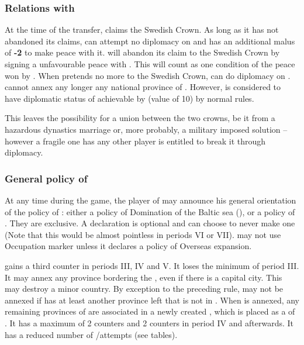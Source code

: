 \subsubsection{Relations with }
\label{chSpecific:Sweden:Denmark}
 At the time of the transfer,
 claims the Swedish Crown. As long as it has not
abandoned its claims, \SUE can attempt no diplomacy on 
and has an additional malus of {\bf -2} to make peace with it.
\aparag {} will abandon its claim to the Swedish Crown by
signing a unfavourable peace with \SUE. This will count as one condition
of the peace won by \SUE.
\bparag When  pretends no more to the Swedish Crown, \SUE
can do diplomacy on .
\bparag \SUE cannot annex any longer any national province of .
However,  is considered to have diplomatic status of \ANNEXION
achievable by \SUE (value of 10) by normal rules.
\begin{designnote}
This leaves the possibility for a union between the two crowns, be it from a
hazardous dynastics marriage or, more probably, a military imposed solution
-- however a fragile one has any other player is entitled to break it through diplomacy.
\end{designnote}
\subsubsection{General policy of }
\aparag At any time during the game, the player of \SUE may announce his
general orientation of the policy of \SUE: either a policy of Domination
of the Baltic sea (), or a policy of
. They are exclusive. A declaration is
optional and \SUE can choose to never make one (Note that this would be
almost pointless in periods VI or VII).
\bparag[] [BLP] \SUE may not use Occupation marker unless it declares
a policy of Overseas expansion.

\label{chSpecific:Sweden:DMB}
\bparag \SUE gains a third \ARMY counter in periods III, IV and V. It
loses the minimum \LeaderE of period III.
\bparag It may annex any province bordering the , even
if there is a capital city. This may destroy a minor country.
\bparag By exception to the preceding rule,  may not
be annexed if  has at least another province left that is
not in . When  is annexed, any
remaining provinces of  are associated in a newly created
, which is placed as a \VASSAL of \SUE.
\bparag It has a maximum of 2 \TP counters and 2 \COL counters in period
IV and afterwards.
\bparag It has a reduced number of \TP/\COL attempts (see tables).


